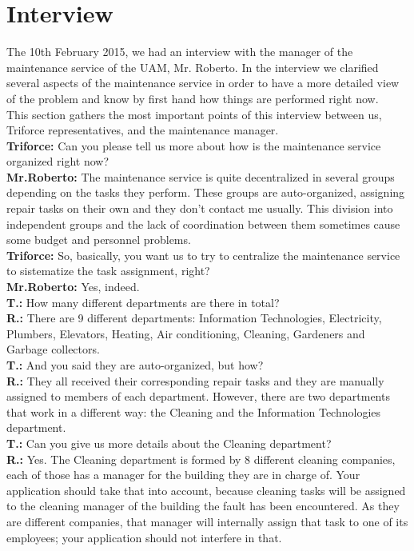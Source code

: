 \section{Interview}

The 10th February 2015, we had an interview with the manager of the maintenance service of the UAM, Mr. Roberto. In the interview we clarified several aspects of the maintenance service in order to have a more detailed view of the problem and know by first hand how things are performed right now.\\

This section gathers the most important points of this interview between us, Triforce representatives, and the maintenance manager.\\

\textbf{Triforce:} Can you please tell us more about how is the maintenance service organized right now?\\
\textbf{Mr.Roberto:} The maintenance service is quite decentralized in several groups depending on the tasks they perform. These groups are auto-organized, assigning repair tasks on their own and they don't contact me usually. This division into independent groups and the lack of coordination between them sometimes cause some budget and personnel problems.\\

\textbf{Triforce:} So, basically, you want us to try to centralize the maintenance service to sistematize the task assignment, right?\\
\textbf{Mr.Roberto:} Yes, indeed.\\

\textbf{T.:} How many different departments are there in total?\\
\textbf{R.:} There are 9 different departments: Information Technologies, Electricity, Plumbers, Elevators, Heating, Air conditioning, Cleaning, Gardeners and Garbage collectors.\\

\textbf{T.:} And you said they are auto-organized, but how?\\
\textbf{R.:} They all received their corresponding repair tasks and they are manually assigned to members of each department. However, there are two departments that work in a different way: the Cleaning and the Information Technologies department.\\

\textbf{T.:} Can you give us more details about the Cleaning department?\\
\textbf{R.:} Yes. The Cleaning department is formed by 8 different cleaning companies, each of those has a manager for the building they are in charge of. Your application should take that into account, because cleaning tasks will be assigned to the cleaning manager of the building the fault has been encountered. As they are different companies, that manager will internally assign that task to one of its employees; your application should not interfere in that.\\

